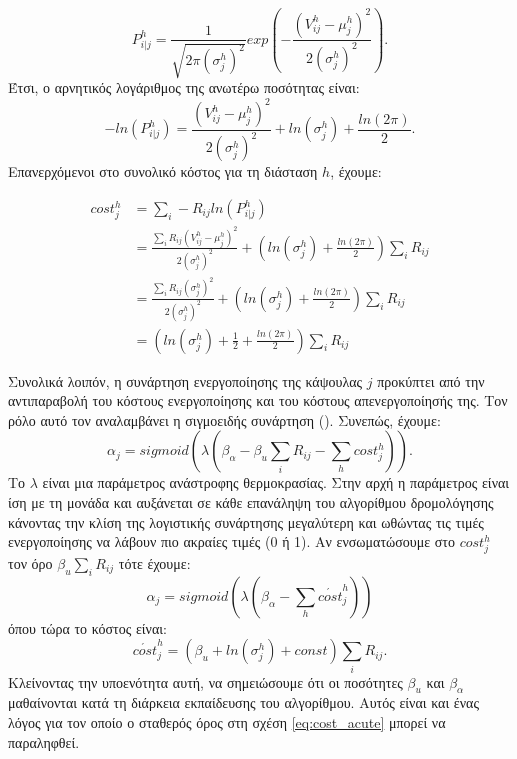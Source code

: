 \begin{itemize}
  \begin{equation}
    P^h_{i|j} = \frac{1}{\sqrt{2\pi(\sigma_j^h)^2}}exp(-\frac{(V_{ij}^h-\mu_j^h)^2}{2(\sigma_j^h)^2}).
  \end{equation}
  Έτσι, ο αρνητικός λογάριθμος της ανωτέρω ποσότητας είναι:
  \begin{equation}
    -ln(P^h_{i|j}) = \frac{(V_{ij}^h-\mu_j^h)^2}{2(\sigma_j^h)^2} + ln(\sigma_j^h) + \frac{ln(2\pi)}{2}.
  \end{equation}
  Επανερχόμενοι στο συνολικό κόστος για τη διάσταση $h$, έχουμε:

  \begin{align}
    cost_j^h &= \sum_i - R_{ij} ln(P^h_{i|j}) \\ &= \frac{\sum_i R_{ij}(V_{ij}^h - \mu_j^h)^2}{2(\sigma_j^h)^2} + (ln(\sigma_j^h) + \frac{ln(2\pi)}{2})\sum_i R_{ij} \\ &= \frac{\sum_i R_{ij}(\sigma_j^h)^2}{2(\sigma_j^h)^2} + (ln(\sigma_j^h) + \frac{ln(2\pi)}{2})\sum_i R_{ij}  \\ &= (ln(\sigma_j^h) + \frac{1}{2} + \frac{ln(2\pi)}{2})\sum_i R_{ij} 
  \end{align}
\end{itemize}

Συνολικά λοιπόν, η συνάρτηση ενεργοποίησης της κάψουλας $j$ προκύπτει από την αντιπαραβολή του κόστους ενεργοποίησης και του κόστους απενεργοποίησής της. Τον ρόλο αυτό τον αναλαμβάνει η σιγμοειδής συνάρτηση (). Συνεπώς, έχουμε:
\begin{equation}
  \alpha_j = sigmoid(\lambda(\beta_{\alpha} - \beta_u \sum_i R_{ij} - \sum_h cost_j^h)).
\end{equation}
Το $\lambda$ είναι μια παράμετρος ανάστροφης θερμοκρασίας. Στην αρχή η παράμετρος είναι ίση με τη μονάδα και αυξάνεται σε κάθε επανάληψη του αλγορίθμου δρομολόγησης κάνοντας την κλίση της λογιστικής συνάρτησης μεγαλύτερη και ωθώντας τις τιμές ενεργοποίησης να λάβουν πιο ακραίες τιμές (0 ή 1). Αν ενσωματώσουμε στο $cost_j^h$ τον όρο $\beta_u \sum_i R_{ij}$ τότε έχουμε:
\begin{equation}
  \alpha_j = sigmoid(\lambda(\beta_{\alpha} - \sum_h \acute{cost}_j^h))
\end{equation}
όπου τώρα το κόστος είναι:
\begin{equation}
  \label{eq:cost_acute}
  \acute{cost} _j^h = (\beta_u + ln(\sigma_j^h) + const)\sum_i R_{ij}.
\end{equation}
Κλείνοντας την υποενότητα αυτή, να σημειώσουμε ότι οι ποσότητες $\beta_u$ και $\beta_{\alpha}$ μαθαίνονται κατά τη διάρκεια εκπαίδευσης του αλγορίθμου. Αυτός είναι και ένας λόγος για τον οποίο ο σταθερός όρος στη σχέση \ref{eq:cost_acute} μπορεί να παραληφθεί.

